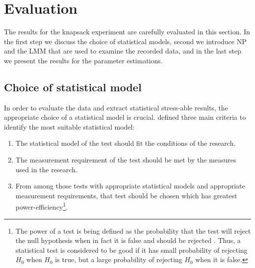 
\chapter{Evaluation}
\label{ch:Evaluation}

The results for the knapsack experiment are carefully evaluated in this section. In the first step we discuss the choice of statistical models, second we introduce \acf{NP} and the \acf{LMM} that are used to examine the recorded data, and in the last step we present the results for the parameter estimations. 

\section{Choice of statistical model}
\label{ch:Evaluation:sec:StatisticalModel}

In order to evaluate the data and extract statistical stress-able results, the appropriate choice of a statistical model is crucial. 
\cite{Siegel1957} defined three main criteria to identify the most suitable statistical model:
\begin{enumerate}
\item The statistical model of the test should fit the conditions of the research.
\item The measurement requirement of the test should be met by the measures used in the research.
\item From among those tests with appropriate statistical models and appropriate measurement requirements, that test should be chosen which has greatest power-efficiency\footnote{The power of a test is being defined as the probability that the test will reject the null hypothesis when in fact it is false and should be rejected \citep{Siegel1957}. Thus, a statistical test is considered to be good if it has small probability of rejecting $H_0$ when $H_0$ is true, but a large probability of rejecting $H_0$ when it is false.}.
\end{enumerate}

